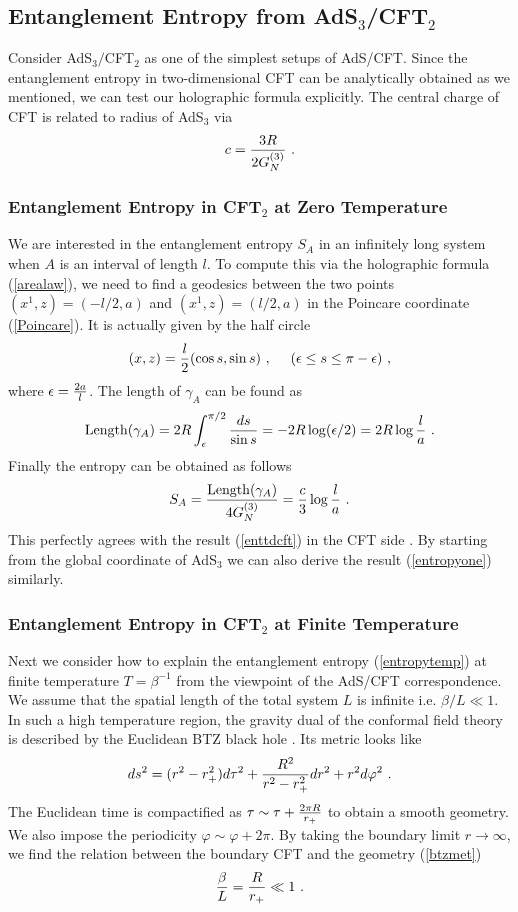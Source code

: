 \documentclass[12pt]{article}
\def\ep{{\epsilon}}
\def\frac#1#2{{#1\over #2}}
\def\f {\frac}
\def\ep{\epsilon}
\def\vp{\varphi}
\def\ep{{\epsilon}}
\def\frac#1#2{{#1\over #2}}
\def\be{\begin{equation}}
\def\ee{\end{equation}}
\begin{document}
\subsection{Entanglement Entropy from AdS$_3$/CFT$_2$}
\label{AdS3/CFT2} \hspace{5mm}
Consider AdS$_3/$CFT$_2$ as one of the simplest setups of AdS/CFT.
Since the entanglement entropy in two-dimensional CFT can be analytically obtained
as we mentioned, we can test our holographic formula explicitly.
The central charge of CFT is related to radius of AdS$_3$ \cite{BH} via
\be
c=\f{3R}{2G^{(3)}_N} \ .\label{centralads}\ee

\subsubsection{Entanglement Entropy in CFT$_2$ at Zero Temperature}
\hspace{5mm}
We are interested in the entanglement entropy $S_A$ in an infinitely long system when
$A$ is an interval of length $l$. To compute this via the holographic formula (\ref{arealaw}),
we need to find a geodesics between the two points $(x^1,z)=(-l/2,a)$ and $(x^1,z)=(l/2,a)$
in the Poincare coordinate (\ref{Poincare}). It is actually given by the half circle
  \be (x,z)=\f{l}{2}(\cos s,\sin s) \ ,\ \ \
\ (\ep\leq s \leq \pi-\ep) \ , \label{geodesicpp}\ee
where $\ep=\f{2a}{l}$.
The length of $\gamma_{A}$
can be found as \be {\rm Length}(\gamma_A)=2R\int^{\pi/2}_\ep \f{ds}{\sin
s}=-2R\log(\ep/2)=2R\log\f{l}{a} \ .\label{lenghthpo} \ee Finally the
entropy can be obtained as follows \be S_A=\f{{\rm
Length}(\gamma_A)}{4G^{(3)}_N}=\f{c}{3}\log\f{l}{a} \ .\label{entrppp}\ee
This perfectly agrees with the result (\ref{enttdcft}) in the CFT side \cite{RuTa,RuTaL}.
By starting from the global coordinate of AdS$_3$ we can also derive the result
(\ref{entropyone}) similarly.



\subsubsection{Entanglement Entropy in CFT$_2$ at Finite Temperature}
\label{AdS3/CFT2BH}
\hspace{5mm} Next we consider how to explain the entanglement
entropy (\ref{entropytemp}) at finite temperature $T=\beta^{-1}$
from the viewpoint of the AdS/CFT correspondence.
We assume that
the spatial length of the total system $L$ is infinite i.e.
$\beta/L\ll 1$. In such a high temperature region, the gravity
dual of the conformal field theory is described by the Euclidean BTZ
black hole \cite{BTZ}. Its metric looks like \be
ds^2=(r^2-r_+^2)d\tau^2+ \f{R^2}{r^2-r^2_{+}}dr^2+r^2 d\vp^2 \ .
\label{btzmet}\ee The Euclidean time is compactified as
$\tau\sim\tau+\f{2\pi R}{r_+}$ to obtain a smooth geometry. We also
impose the periodicity $\vp\sim \vp+2\pi$. By taking the boundary
limit $r\to \infty$, we find the relation between the boundary CFT
and the geometry (\ref{btzmet}) \be \f{\beta}{L}=\f{R}{r_{+}}\ll 1 \ .
\label{relationbtz}\ee
\end{document}
